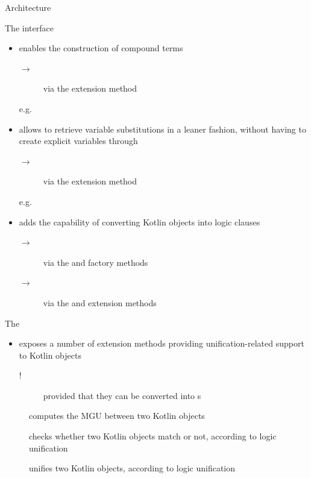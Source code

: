 \documentclass[handout]{beamer}
\begin{document}
\begin{frame}[allowframebreaks]{Architecture}
    \framebreak

    \begin{block}{The  interface}
        \begin{itemize}
            \item enables the construction of compound terms
            \begin{description}
                \item [$\rightarrow$] via the  extension method
                \item [e.g.] 
            \end{description}
            \item allows to retrieve variable substitutions in a leaner fashion, without having to create explicit variables through 
            \begin{description}
                \item [$\rightarrow$] via the  extension method
                \item [e.g.] 
            \end{description}
            \item adds the capability of converting Kotlin objects into logic clauses
            \begin{description}
                \item [$\rightarrow$] via the  and  factory methods
                \item [$\rightarrow$] via the  and  extension methods
            \end{description}
        \end{itemize}
    \end{block}

    \framebreak

    \begin{block}{The }
        \begin{itemize}
            \item exposes a number of extension methods providing unification-related support to Kotlin objects
            \begin{description}
                \item [!] provided that they can be converted into s 
            \end{description}
        \end{itemize}
    \end{block}
    \begin{description}
        \item [] computes the MGU between two Kotlin objects
        \item [] checks whether two Kotlin objects match or not, according to logic unification
        \item [] unifies two Kotlin objects, according to logic unification
    \end{description}


\end{frame}
\end{document}
